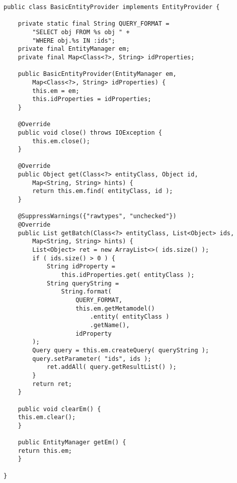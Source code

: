 \begin{lstlisting}[frame=htrbl, caption={BasicEntityProvider.java}, label={lst:BasicEntityProvider.java}]
public class BasicEntityProvider implements EntityProvider {

	private static final String QUERY_FORMAT = 
		"SELECT obj FROM %s obj " +
		"WHERE obj.%s IN :ids";
	private final EntityManager em;
	private final Map<Class<?>, String> idProperties;

	public BasicEntityProvider(EntityManager em,
		Map<Class<?>, String> idProperties) {
		this.em = em;
		this.idProperties = idProperties;
	}

	@Override
	public void close() throws IOException {
		this.em.close();
	}

	@Override
	public Object get(Class<?> entityClass, Object id,
		Map<String, String> hints) {
		return this.em.find( entityClass, id );
	}

	@SuppressWarnings({"rawtypes", "unchecked"})
	@Override
	public List getBatch(Class<?> entityClass, List<Object> ids,
		Map<String, String> hints) {
		List<Object> ret = new ArrayList<>( ids.size() );
		if ( ids.size() > 0 ) {
			String idProperty = 
				this.idProperties.get( entityClass );
			String queryString = 
				String.format(
					QUERY_FORMAT,
					this.em.getMetamodel()
						.entity( entityClass )
						.getName(),
					idProperty
		);
		Query query = this.em.createQuery( queryString );
		query.setParameter( "ids", ids );
			ret.addAll( query.getResultList() );
		}
		return ret;
	}
	
	public void clearEm() {
	this.em.clear();
	}

	public EntityManager getEm() {
	return this.em;
	}

}
\end{lstlisting}